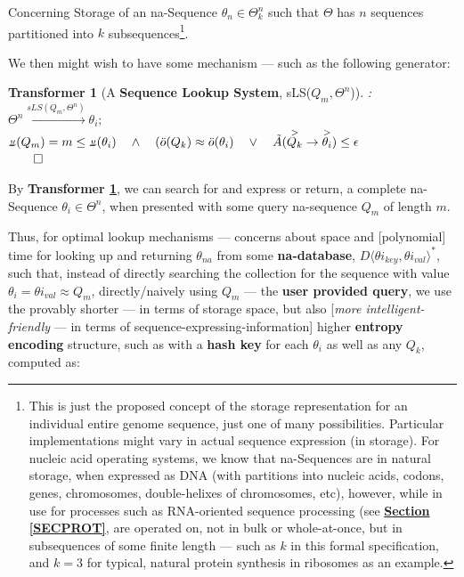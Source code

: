 \documentclass[a4paper, 18pt]{book} %
\newtheorem{transf}{Transformer}
\newcommand{\invpi}{\rotatebox[origin=c]{180}{$\pi$}}
\begin{document}
Concerning Storage of an na-Sequence $\theta_n \in \Theta^n_k$ such that  $\Theta$ has $n$ sequences partitioned into $k$ subsequences\footnote{This is just the proposed concept of the storage representation for an individual entire genome sequence,  just one of many possibilities. Particular implementations might vary in actual sequence expression (in storage). For nucleic acid operating systems, we know that na-Sequences are in natural storage, when expressed as DNA (with partitions into nucleic acids, codons, genes, chromosomes, double-helixes of chromosomes, etc), however, while in use for processes such as RNA-oriented sequence processing (see \textbf{\hyperref[SECPROT]{Section \ref{SECPROT}}}, are operated on, not in bulk or whole-at-once, but in subsequences of some finite length --- such as $k$ in this formal specification, and $k=3$ for typical, natural protein synthesis in ribosomes as an example.}.

We then might wish to have some mechanism --- such as the following generator:\\


\begin{transf}[A \textbf{Sequence Lookup System}, sLS($Q_m,\Theta^n$)]:
\label{TRANSFSEQLOOKUP}
$ $\\
$\Theta^n \xrightarrow{sLS(Q_m,\Theta^n)} \theta_i;$\\ 
$\invpi(Q_m) = m \leq \invpi(\theta_i) \quad \land \quad (\ddot{o}(Q_k) \approx \ddot{o}(\theta_i) \quad \lor \quad \tilde{A}(\overset{>}{Q_k} \rightarrow \overset{>}{\theta_i}) \leq \epsilon$\\
$\qed$
\end{transf}


By \textbf{Transformer \ref{TRANSFSEQLOOKUP}}, we can search for and express or return, a complete na-Sequence $\theta_i \in \Theta^n$, when presented with some query na-sequence $Q_m$ of length $m$.

Thus, for optimal lookup mechanisms --- concerns about space and [polynomial] time for looking up and returning $\theta_{na}$ from some \textbf{na-database}, $D\langle {\theta i}_{key}, {\theta i}_{val} \rangle^*$, such that, instead of directly searching the collection for the sequence with value $\theta_i = {\theta i}_{val} \approx Q_m$, directly/naively using $Q_m$ --- the \textbf{user provided query}, we use the provably shorter --- in terms of storage space, but also [\textit{more intelligent-friendly} --- in terms of sequence-expressing-information] higher \textbf{entropy encoding} structure, such as with a \textbf{hash key} for each $\theta_i$ as well as any $Q_k$, computed as:\\
\end{document}
